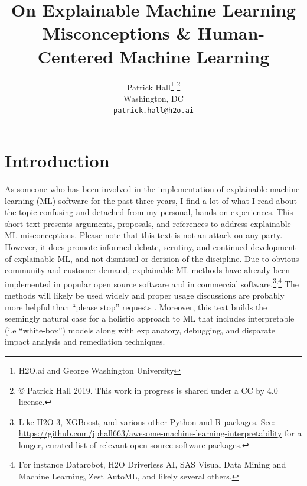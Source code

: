 \documentclass[fleqn]{article}
\title{On Explainable Machine Learning Misconceptions \& Human-Centered Machine Learning}
\author{
  Patrick Hall\footnote{H2O.ai and George Washington University} \footnote{\copyright \hspace{1pt} Patrick Hall 2019. This work in progress is shared under a CC by 4.0 license.}\\
  Washington, DC\\
  \texttt{patrick.hall@h2o.ai}
}
\begin{document}
\maketitle

\section*{Introduction}

As someone who has been involved in the implementation of explainable machine learning (ML) software for the past three years, I find a lot of what I read about the topic confusing and detached from my personal, hands-on experiences. This short text presents arguments, proposals, and references to address explainable ML misconceptions. Please note that this text is not an attack on any party. However, it does promote informed debate, scrutiny, and continued development of explainable ML, and not dismissal or derision of the discipline. Due to obvious community and customer demand, explainable ML methods have already been implemented in popular open source software and in commercial software.\footnote{Like H2O-3, XGBoost, and various other Python and R packages. See: \url{https://github.com/jphall663/awesome-machine-learning-interpretability} for a longer, curated list of relevant open source software packages.}\textsuperscript{,}\footnote{For instance  Datarobot, H2O Driverless AI, SAS Visual Data Mining and Machine Learning, Zest AutoML, and likely several others.} The methods will likely be used widely and proper usage discussions are probably more helpful than ``please stop'' requests \cite{please_stop}. Moreover, this text builds the seemingly natural case for a holistic approach to ML that includes interpretable (i.e ``white-box'') models along with explanatory, debugging, and disparate impact analysis and remediation techniques.\\

\end{document}
